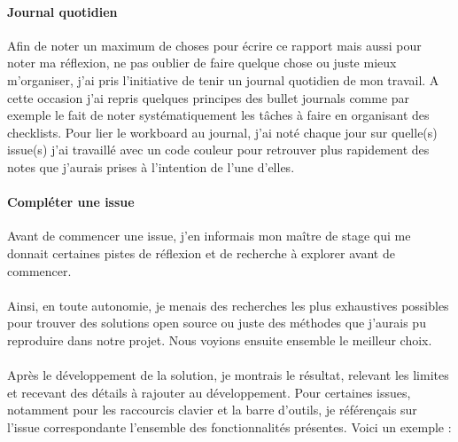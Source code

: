 \documentclass[12pt]{article}
\begin{document}
\paragraph{Journal quotidien}
Afin de noter un maximum de choses pour écrire ce rapport mais aussi pour noter ma réflexion, ne pas oublier de faire quelque chose ou juste mieux m'organiser, j'ai pris l'initiative de tenir un journal quotidien de mon travail. A cette occasion j'ai repris quelques principes des bullet journals comme par exemple le fait de noter systématiquement les tâches à faire en organisant des checklists. Pour lier le workboard au journal, j'ai noté chaque jour sur quelle(s) issue(s) j'ai travaillé avec un code couleur pour retrouver plus rapidement des notes que j'aurais prises à l'intention de l'une d'elles.\\

\paragraph{Compléter une issue}
Avant de commencer une issue, j'en informais mon maître de stage qui me donnait certaines pistes de réflexion et de recherche à explorer avant de commencer.
\paragraph{}
Ainsi, en toute autonomie, je menais des recherches les plus exhaustives possibles pour trouver des solutions open source ou juste des méthodes que j'aurais pu reproduire dans notre projet. Nous voyions ensuite ensemble le meilleur choix.
\paragraph{}
Après le développement de la solution, je montrais le résultat, relevant les limites et recevant des détails à rajouter au développement. Pour certaines issues, notamment pour les raccourcis clavier et la barre d'outils, je référençais sur l'issue correspondante l'ensemble des fonctionnalités présentes. Voici un exemple :
\end{document}
